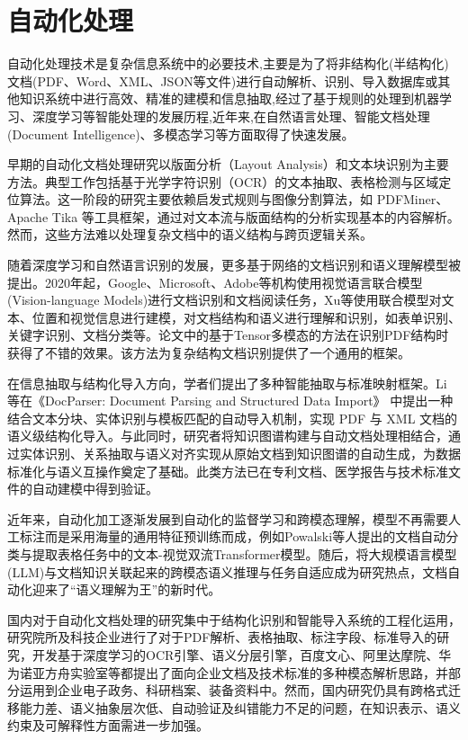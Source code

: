 \section{自动化处理}

自动化处理技术是复杂信息系统中的必要技术,主要是为了将非结构化(半结构化)文档(PDF、Word、XML、JSON等文件)进行自动解析、识别、导入数据库或其他知识系统中进行高效、精准的建模和信息抽取,经过了基于规则的处理到机器学习、深度学习等智能处理的发展历程,近年来,在自然语言处理、智能文档处理(Document Intelligence)、多模态学习等方面取得了快速发展。

早期的自动化文档处理研究以版面分析（Layout Analysis）和文本块识别为主要方法。典型工作包括基于光学字符识别（OCR）的文本抽取、表格检测与区域定位算法。这一阶段的研究主要依赖启发式规则与图像分割算法，如 PDFMiner、Apache Tika 等工具框架，通过对文本流与版面结构的分析实现基本的内容解析。然而，这些方法难以处理复杂文档中的语义结构与跨页逻辑关系。

随着深度学习和自然语言识别的发展，更多基于网络的文档识别和语义理解模型被提出。2020年起，Google、Microsoft、Adobe等机构使用视觉语言联合模型(Vision-language Models)进行文档识别和文档阅读任务\cite{Xu2020LayoutLM,Xu2022LayoutLMv3}，Xu等使用联合模型对文本、位置和视觉信息进行建模，对文档结构和语义进行理解和识别，如表单识别、关键字识别、文档分类等。论文中的基于Tensor多模态的方法在识别PDF结构时获得了不错的效果。该方法为复杂结构文档识别提供了一个通用的框架。

在信息抽取与结构化导入方向，学者们提出了多种智能抽取与标准映射框架。Li 等在《DocParser: Document Parsing and Structured Data Import》\cite{Li2021DocParser} 中提出一种结合文本分块、实体识别与模板匹配的自动导入机制，实现 PDF 与 XML 文档的语义级结构化导入。与此同时，研究者将知识图谱构建与自动文档处理相结合，通过实体识别、关系抽取与语义对齐实现从原始文档到知识图谱的自动生成，为数据标准化与语义互操作奠定了基础。此类方法已在专利文档、医学报告与技术标准文件的自动建模中得到验证。

近年来，自动化加工逐渐发展到自动化的监督学习和跨模态理解，模型不再需要人工标注而是采用海量的通用特征预训练而成，例如Powalski等人提出的文档自动分类与提取表格任务中的文本-视觉双流Transformer模型\cite{Powalski2021DocFormer}。随后，将大规模语言模型(LLM)与文档知识关联起来的跨模态语义推理与任务自适应成为研究热点\cite{Wang2023DocumentLLM}，文档自动化迎来了“语义理解为王”的新时代。

国内对于自动化文档处理的研究集中于结构化识别和智能导入系统的工程化运用，研究院所及科技企业进行了对于PDF解析、表格抽取、标注字段、标准导入的研究，开发基于深度学习的OCR引擎、语义分层引擎，百度文心、阿里达摩院、华为诺亚方舟实验室等都提出了面向企业文档及技术标准的多种模态解析思路，并部分运用到企业电子政务、科研档案、装备资料中。然而，国内研究仍具有跨格式迁移能力差、语义抽象层次低、自动验证及纠错能力不足的问题，在知识表示、语义约束及可解释性方面需进一步加强。

